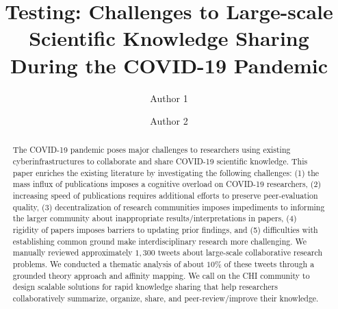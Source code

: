 \documentclass[acmsmall,authordraft]{acmart}
\begin{document}
\title[Scientific Knowledge Sharing at Scale During Pandemic]{Testing: Challenges to Large-scale Scientific Knowledge Sharing During the COVID-19 Pandemic}

\author{Author 1}

\author{Author 2}


\renewcommand{\shortauthors}{Author 1, et al.}

\begin{abstract}
The COVID-19 pandemic poses major challenges to researchers using existing cyberinfrastructures to collaborate and share COVID-19 scientific knowledge. This paper enriches the existing literature by investigating the following challenges: (1) the mass influx of publications imposes a cognitive overload on COVID-19 researchers, (2) increasing speed of publications requires additional efforts to preserve peer-evaluation quality, (3) decentralization of research communities imposes impediments to informing the larger community about inappropriate results/interpretations in papers, (4) rigidity of papers imposes barriers to updating prior findings, and (5) difficulties with establishing common ground make interdisciplinary research more challenging. We manually reviewed approximately $1,300$ tweets about large-scale collaborative research problems. We conducted a thematic analysis of about $10\%$ of these tweets through a grounded theory approach and affinity mapping. We call on the CHI community to design scalable solutions for rapid knowledge sharing that help researchers collaboratively summarize, organize, share, and peer-review/improve their knowledge.
\end{abstract}
\end{document}
